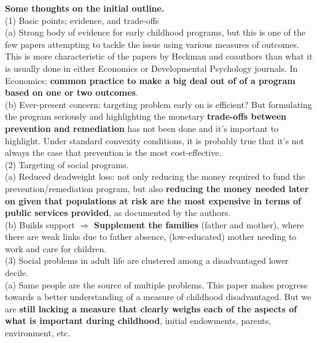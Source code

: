 



\doublespacing

\noindent \textbf{Some thoughts on the initial outline.}\\

\noindent (1) Basic points; evidence, and trade-offs \\ 

\noindent (a) Strong body of evidence for early childhood programs, but this is one of the few papers attempting to tackle the issue using various measures of outcomes. This is more characteristic of the papers by Heckman and coauthors than what it is usually done in either Economics or Developmental Psychology journals. In Economics: \textbf{common practice to make a big deal out of of a program based on one or two outcomes}.\\

\noindent (b) Ever-present concern: targeting problem early on is efficient? But formulating the program seriously and highlighting the monetary \textbf{trade-offs between prevention and remediation} has not been done and it's important to highlight. Under standard convexity conditions, it is probably true that it's not always the case that prevention is the most cost-effective.\\

\noindent (2) Targeting of social programs.\\ 

\noindent (a) Reduced deadweight loss: not only reducing the money required to fund the prevention/remediation program, but also \textbf{reducing the money needed later on given that populations at risk are the most expensive in terms of public services provided}, as documented by the authors.\\

\noindent (b) Builds support $\Rightarrow$ \textbf{Supplement the families} (father and mother), where there are weak links due to father absence, (low-educated) mother needing to work and care for children.\\ 

\noindent (3) Social problems in adult life are clustered among a disadvantaged lower decile.\\

\noindent (a) Same people are the source of multiple problems. This paper makes progress towards a better understanding of a measure of childhood disadvantaged. But we are \textbf{still lacking a measure that clearly weighs each of the aspects of what is important during childhood}, initial endowments, parents, environment, etc.\\

